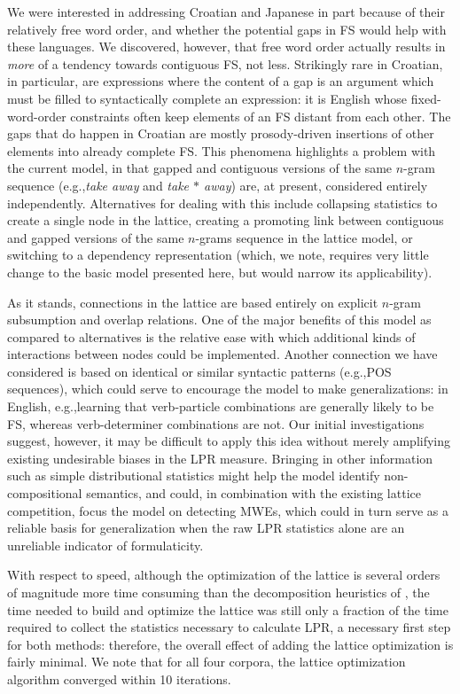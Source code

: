 \documentclass[11pt,letterpaper]{article}
\makeatletter
\def \eg {e.g.,\@ }
\newcommand{\gap}{$*$\xspace}
\newcommand{\ex}[1]{\textit{#1}\xspace}
\makeatother
\begin{document}
We were interested in addressing Croatian and Japanese in part because of their relatively free word order, and whether the potential gaps in FS would help with these languages. We discovered, however, that free word order actually results in \emph{more} of a tendency towards contiguous FS, not less. Strikingly rare in Croatian, in particular, are expressions where the content of a gap is an argument which must be filled to syntactically complete an expression: it is English whose fixed-word-order constraints often keep elements of an FS distant from each other. The gaps that do happen in Croatian are mostly prosody-driven insertions of other elements into already complete FS. This phenomena highlights a problem with the current model, in that gapped and contiguous versions  of the same $n$-gram sequence (\eg \ex{take away} and \ex{take \gap away}) are, at present, considered entirely independently. Alternatives for dealing with this include collapsing statistics to create a single node in the lattice, creating a promoting link between contiguous and gapped versions of the same $n$-grams sequence in the lattice model, or switching to a dependency representation (which, we note, requires very little change to the basic model presented here, but would narrow its applicability). 

As it stands, connections in the lattice are based entirely on explicit $n$-gram subsumption and overlap relations. One of the major benefits of this model as compared to alternatives is the relative ease with which additional kinds of interactions between nodes could be implemented. Another connection we have considered is based on identical or similar syntactic patterns (\eg POS sequences), which could serve to encourage the model to make generalizations: in English, \eg learning that verb-particle combinations are generally likely to be FS, whereas verb-determiner combinations are not. Our initial investigations suggest, however, it may be difficult to apply this idea without merely amplifying existing undesirable biases in the LPR measure. Bringing in other information such as simple distributional statistics might help the model identify non-compositional semantics, and could, in combination with the existing lattice competition, focus the model on detecting MWEs, which could in turn serve as a reliable basis for generalization when the raw LPR statistics alone are an unreliable indicator of formulaticity.

With respect to speed, although the optimization of the lattice is several orders of magnitude more time consuming than the decomposition heuristics of , the time needed to build and optimize the lattice was still only a fraction of the time required to collect the statistics necessary to calculate LPR, a necessary first step for both methods: therefore, the overall effect of adding the lattice optimization is fairly minimal. We note that for all four corpora, the lattice optimization algorithm converged within 10 iterations.
\end{document}
